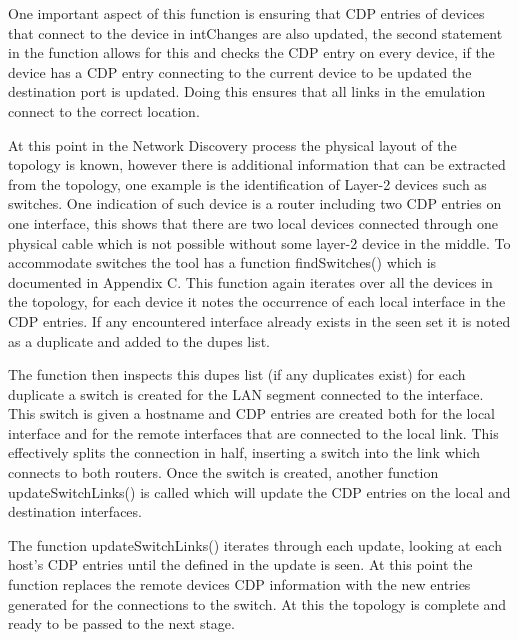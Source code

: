 \documentclass[11pt]{report}
\begin{document}
One important aspect of this function is ensuring that CDP entries of devices that connect to the device in intChanges are also updated, the second statement in the function allows for this and checks the CDP entry on every device, if the device has a CDP entry connecting to the current device to be updated the destination port is updated. Doing this ensures that all links in the emulation connect to the correct location.

At this point in the Network Discovery process the physical layout of the topology is known, however there is additional information that can be extracted from the topology, one example is the identification of Layer-2 devices such as switches. One indication of such device is a router including two CDP entries on one interface, this shows that there are two local devices connected through one physical cable which is not possible without some layer-2 device in the middle. To accommodate switches the tool has a function findSwitches() which is documented in Appendix C. This function again iterates over all the devices in the topology, for each device it notes the occurrence of each local interface in the CDP entries. If any encountered interface already exists in the seen set it is noted as a duplicate and added to the dupes list.

The function then inspects this dupes list (if any duplicates exist) for each duplicate a switch is created for the LAN segment connected to the interface. This switch is given a hostname and CDP entries are created both for the local interface and for the remote interfaces that are connected to the local link. This effectively splits the connection in half, inserting a switch into the link which connects to both routers. Once the switch is created, another function updateSwitchLinks() is called which will update the CDP entries on the local and destination interfaces.

The function updateSwitchLinks() iterates through each update, looking at each host's CDP entries until the defined in the update is seen. At this point the function replaces the remote devices CDP information with the new entries generated for the connections to the switch. At this the topology is complete and ready to be passed to the next stage.
\end{document}
